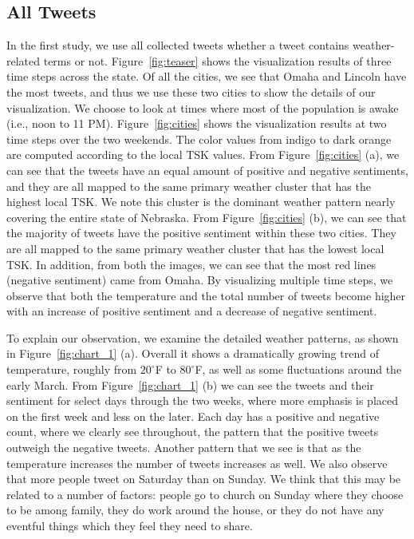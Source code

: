 \subsection{All Tweets}



In the first study, we use all collected tweets whether a tweet contains weather-related terms or not. Figure~\ref{fig:teaser} shows the visualization results of three time steps across the state. 
Of all the cities, we see that Omaha and Lincoln have the most tweets, and thus we use these two cities to show the details of our visualization. We choose to look at times where most of the population is awake (i.e., noon to 11 PM). Figure~\ref{fig:cities} shows the visualization results at two time steps over the two weekends. The color values from indigo to dark orange are computed according to the local TSK values. From Figure~\ref{fig:cities} (a), we can see that the tweets have an equal amount of positive and negative sentiments, and they are all mapped to the same primary weather cluster that has the highest local TSK. We note this cluster is the dominant weather pattern nearly covering the entire state of Nebraska. From Figure~\ref{fig:cities} (b), we can see that the majority of tweets have the positive sentiment within these two cities. They are all mapped to the same primary weather cluster that has the lowest local TSK. In addition, from both the images, we can see that the most red lines (negative sentiment) came from Omaha. By visualizing multiple time steps, we observe that both the temperature and the total number of tweets become higher with an increase of positive sentiment and a decrease of negative sentiment.



To explain our observation, we examine the detailed weather patterns, as shown in Figure~\ref{fig:chart_1} (a). Overall it shows a dramatically growing trend of temperature, roughly from $20^\circ$F to $80^\circ$F, as well as some fluctuations around the early March. From Figure~\ref{fig:chart_1} (b) we can see the tweets and their sentiment for select days through the two weeks, where more emphasis is placed on the first week and less on the later. Each day has a positive and negative count, where we clearly see throughout, the pattern that the positive tweets outweigh the negative tweets. Another pattern that we see is that as the temperature increases the number of tweets increases as well. We also observe that more people tweet on Saturday than on Sunday. We think that this may be related to a number of factors: people go to church on Sunday where they choose to be among family, they do work around the house, or they do not have any eventful things which they feel they need to share.

